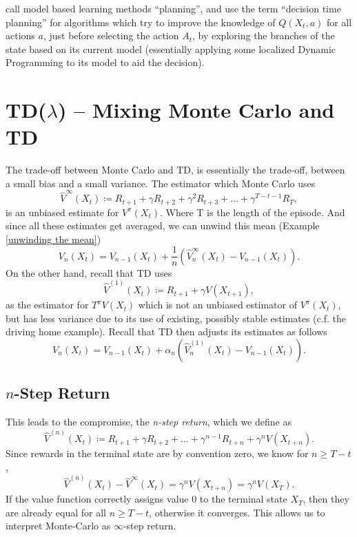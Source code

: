 \textcite{suttonReinforcementLearningIntroduction1998} call model based learning methods ``planning'', and use the term ``decision time planning'' for algorithms which try to improve the knowledge of \(Q(X_t,a)\) for all actions \(a\), just before selecting the action \(A_t\), by exploring the branches of the state based on its current model (essentially applying some localized Dynamic Programming to its model to aid the decision).



\section{TD(\(\lambda\)) -- Mixing Monte Carlo and TD} 
The trade-off between Monte Carlo and TD, is essentially the trade-off, between a small bias and a small variance. 
The estimator which Monte Carlo uses 
\[
	\hat{V}^\infty (X_t) \coloneqq R_{t+1} + \gamma R_{t+2} + \gamma^2 R_{t+3} + \dotsc + \gamma^{T-t-1} R_T,
\]
is an unbiased estimate for \(V^\pi(X_t)\). Where T is the length of the episode. And since all these estimates get averaged, we can unwind this mean (Example \ref{unwinding the mean})
\[
	V_n(X_t) = V_{n-1}(X_t) + \frac{1}{n}(\hat{V}_n^\infty (X_t)- V_{n-1}(X_t)).
\]
On the other hand, recall that TD uses 
\[
	\hat{V}^{(1)}(X_t)\coloneqq R_{t+1} + \gamma V(X_{t+1}),
\]
as the estimator for \(T^\pi V(X_t)\) which is not an unbiased estimator of \(V^\pi(X_t)\), but has less variance due to its use of existing, possibly stable estimates (c.f. the driving home example). Recall that TD then adjusts its estimates as follows
\[
	V_n(X_t)=V_{n-1}(X_t) + \alpha_n (\hat{V}_n^{(1)}(X_t) - V_{n-1}(X_t)).
\]
\subsection{\(n\)-Step Return}
This leads to the compromise, the \emph{n-step return}, which we define as 
\[
	\hat{V}^{(n)}(X_t)\coloneqq R_{t+1} +\gamma R_{t+2} + \dotsc + \gamma^{n-1}R_{t+n}+ \gamma^n V(X_{t+n}).
\]
Since rewards in the terminal state are by convention zero, we know for \(n\ge T-t\),
\[
	\hat{V}^{(n)}(X_t)-\hat{V}^\infty(X_t) = \gamma^n V(X_{t+n}) = \gamma^n V(X_T).
\]
If the value function correctly assigns value \(0\) to the terminal state \(X_T\), then they are already equal for all \(n\ge T-t\), otherwise it converges. This allows us to interpret Monte-Carlo as \(\infty\)-step return.

